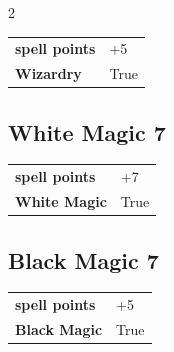 \begin{multicols}{2}
\begin{tcolorbox}
\begin{tabular}{@{}ll@{}}
    \textbf{spell points} & +5\\
    \textbf{Wizardry} & True\\
\end{tabular}


\end{tcolorbox}

\begin{tcolorbox}
    \subsection*{White Magic \hfill \small{7 }}
    \tcblower




\begin{tabular}{@{}ll@{}}
    \textbf{spell points} & +7\\
    \textbf{White Magic} & True\\
\end{tabular}


\end{tcolorbox}

\begin{tcolorbox}
    \subsection*{Black Magic \hfill \small{7 }}
    \tcblower




\begin{tabular}{@{}ll@{}}
    \textbf{spell points} & +5\\
    \textbf{Black Magic} & True\\
\end{tabular}


\end{tcolorbox}

\begin{tcolorbox}

\end{tcolorbox}
\end{multicols}
